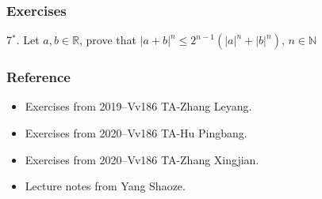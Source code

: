 \documentclass{beamer}
\begin{document}
\begin{frame}
    \frametitle{Exercises}
    7$^*$. Let $a, b \in \mathbb{R} $, prove that $|a+b|^n \leq 2^{n-1} (|a|^n+|b|^n)$, $n \in \mathbb{N}$
    

\end{frame}
\begin{frame}
    \frametitle{Reference}
    \begin{itemize}
        \item Exercises from 2019--Vv186 TA-Zhang Leyang.
        \item Exercises from 2020--Vv186 TA-Hu Pingbang.
        \item Exercises from 2020--Vv186 TA-Zhang Xingjian.
        \item Lecture notes from Yang Shaoze.
    \end{itemize}
\end{frame}
\end{document}
